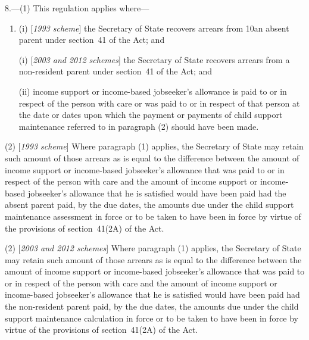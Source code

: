 \documentclass[12pt,a4paper]{article}
\begin{document}
8.—(1) This regulation applies where—
\begin{enumerate}\item[]
(i) [\emph{1993 scheme}] the Secretary of State recovers arrears from 10an absent parent under section~41 of the Act; and

(i) [\emph{2003 and 2012 schemes}] the Secretary of State recovers arrears from 
a non-resident parent  %
under section~41 of the Act; and

(ii) income support
or income-based jobseeker’s allowance  %
is paid to or in respect of the person with care or was paid to or in respect of that person at the date or dates upon which the payment or payments of child support maintenance referred to in paragraph (2) should have been made.
\end{enumerate}

(2) [\emph{1993 scheme}] Where paragraph (1) applies, the Secretary of State may retain such amount of those arrears as is equal to the difference between the amount of income support 
or income-based jobseeker’s allowance  %
that was paid to or in respect of the person with care and the amount of income support 
or income-based jobseeker’s allowance  %
that he is satisfied would have been paid had the absent parent paid, by the due dates, the amounts due under the child support maintenance assessment in force or to be taken to have been in force by virtue of the provisions of section~41(2A) of the Act.

(2) [\emph{2003 and 2012 schemes}] Where paragraph (1) applies, the Secretary of State may retain such amount of those arrears as is equal to the difference between the amount of income support 
or income-based jobseeker’s allowance  %
that was paid to or in respect of the person with care and the amount of income support 
or income-based jobseeker’s allowance  %
that he is satisfied would have been paid had the 
non-resident parent  %
paid, by the due dates, the amounts due under the child support 
maintenance calculation  %
in force or to be taken to have been in force by virtue of the provisions of section~41(2A) of the Act.
\end{document}
